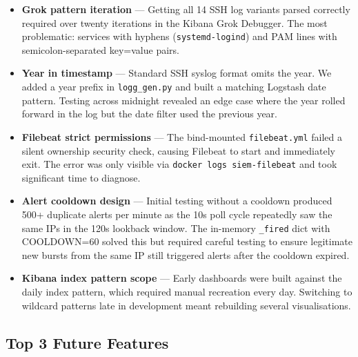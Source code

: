 \documentclass[12pt,a4paper]{article}
\newcommand{\file}[1]{\texttt{\color{accent}#1}}
\begin{document}
\begin{itemize}[leftmargin=2em]
  \item \textbf{Grok pattern iteration} — Getting all 14 SSH log variants
        parsed correctly required over twenty iterations in the Kibana Grok
        Debugger. The most problematic: services with hyphens
        (\texttt{systemd-logind}) and PAM lines with semicolon-separated
        key=value pairs.
  \item \textbf{Year in timestamp} — Standard SSH syslog format omits the
        year. We added a year prefix in \file{logg\_gen.py} and built a
        matching Logstash date pattern. Testing across midnight revealed an
        edge case where the year rolled forward in the log but the date filter
        used the previous year.
  \item \textbf{Filebeat strict permissions} — The bind-mounted
        \file{filebeat.yml} failed a silent ownership security check, causing
        Filebeat to start and immediately exit. The error was only visible via
        \texttt{docker logs siem-filebeat} and took significant time to
        diagnose.
  \item \textbf{Alert cooldown design} — Initial testing without a cooldown
        produced 500+ duplicate alerts per minute as the 10s poll cycle
        repeatedly saw the same IPs in the 120s lookback window. The
        in-memory \texttt{\_fired} dict with COOLDOWN=60 solved this but
        required careful testing to ensure legitimate new bursts from the same
        IP still triggered alerts after the cooldown expired.
  \item \textbf{Kibana index pattern scope} — Early dashboards were built
        against the daily index pattern, which required manual recreation every
        day. Switching to wildcard patterns late in development meant
        rebuilding several visualisations.
\end{itemize}

\subsection{Top 3 Future Features}
\end{document}
